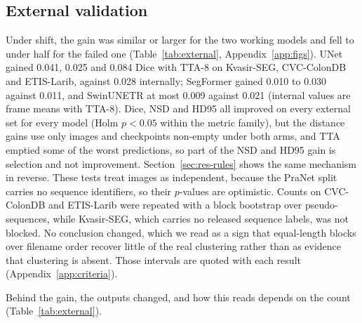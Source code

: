 \subsection{External validation}
\label{sec:res-external}
Under shift, the gain was similar or larger for the two working models and fell to under half for the failed one (Table~\ref{tab:external}, Appendix~\ref{app:figs}). UNet gained 0.041, 0.025 and 0.084 Dice with TTA-8 on Kvasir-SEG, CVC-ColonDB and ETIS-Larib, against 0.028 internally; SegFormer gained 0.010 to 0.030 against 0.011, and SwinUNETR at most 0.009 against 0.021 (internal values are frame means with TTA-8). Dice, NSD and HD95 all improved on every external set for every model (Holm $p<0.05$ within the metric family), but the distance gains use only images and checkpoints non-empty under both arms, and TTA emptied some of the worst predictions, so part of the NSD and HD95 gain is selection and not improvement. Section~\ref{sec:res-rules} shows the same mechanism in reverse. These tests treat images as independent, because the PraNet split carries no sequence identifiers, so their $p$-values are optimistic. Counts on CVC-ColonDB and ETIS-Larib were repeated with a block bootstrap over pseudo-sequences, while Kvasir-SEG, which carries no released sequence labels, was not blocked. No conclusion changed, which we read as a sign that equal-length blocks over filename order recover little of the real clustering rather than as evidence that clustering is absent. Those intervals are quoted with each result (Appendix~\ref{app:criteria}).

Behind the gain, the outputs changed, and how this reads depends on the count (Table~\ref{tab:external}).

